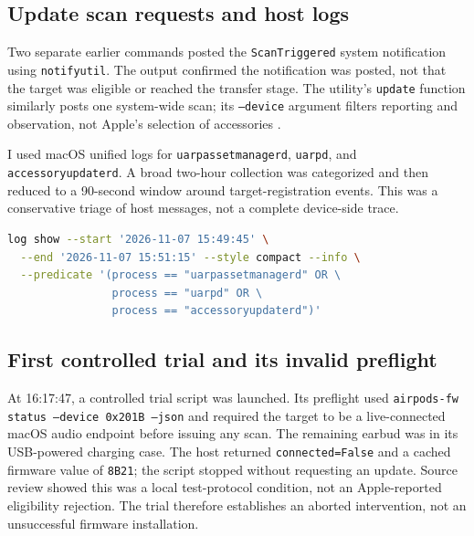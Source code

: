 \documentclass[11pt,letterpaper]{article}
\begin{document}
\subsection{Update scan requests and host logs}
Two separate earlier commands posted the \texttt{ScanTriggered} system notification using \texttt{notifyutil}. The output confirmed the notification was posted, not that the target was eligible or reached the transfer stage. The utility's \texttt{update} function similarly posts one system-wide scan; its \texttt{--device} argument filters reporting and observation, not Apple's selection of accessories \cite{airpodsfw}.

I used macOS unified logs for \texttt{uarpassetmanagerd}, \texttt{uarpd}, and \texttt{accessoryupdaterd}. A broad two-hour collection was categorized and then reduced to a 90-second window around target-registration events. This was a conservative triage of host messages, not a complete device-side trace.
\begin{lstlisting}[language=bash]
log show --start '2026-11-07 15:49:45' \
  --end '2026-11-07 15:51:15' --style compact --info \
  --predicate '(process == "uarpassetmanagerd" OR \
                process == "uarpd" OR \
                process == "accessoryupdaterd")'
\end{lstlisting}

\subsection{First controlled trial and its invalid preflight}
At 16:17:47, a controlled trial script was launched. Its preflight used \texttt{airpods-fw status --device 0x201B --json} and required the target to be a live-connected macOS audio endpoint before issuing any scan. The remaining earbud was in its USB-powered charging case. The host returned \texttt{connected=False} and a cached firmware value of \texttt{8B21}; the script stopped without requesting an update. Source review showed this was a local test-protocol condition, not an Apple-reported eligibility rejection. The trial therefore establishes an aborted intervention, not an unsuccessful firmware installation.
\end{document}
